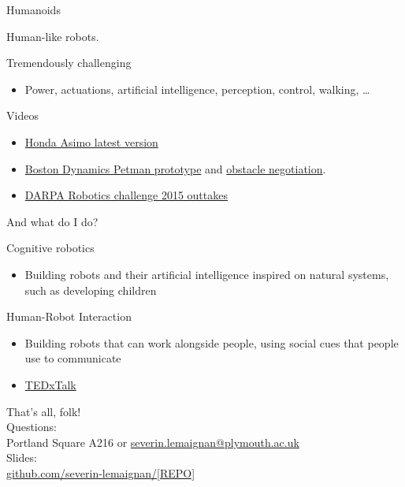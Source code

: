 \documentclass[compress]{beamer}
\begin{document}
\begin{frame}{Humanoids}

Human-like robots.

Tremendously challenging

\begin{itemize}
\item
  Power, actuations, artificial intelligence, perception, control,
  walking, \ldots{}
\end{itemize}

Videos

\begin{itemize}
\item
  \href{http://youtu.be/yND4k4NM0qU}{Honda Asimo latest version}
\item
  \href{http://youtu.be/aqCmX5dMYHg}{Boston Dynamics Petman prototype}
  and \href{http://youtu.be/FFGfq0pRczY}{obstacle negotiation}.
\item
  \href{https://www.youtube.com/watch?v=g0TaYhjpOfo}{DARPA Robotics
  challenge 2015 outtakes}
\end{itemize}

\end{frame}

\begin{frame}{And what do I do?}

Cognitive robotics

\begin{itemize}
\item
  Building robots and their artificial intelligence inspired on natural
  systems, such as developing children
\end{itemize}

Human-Robot Interaction

\begin{itemize}
\item
  Building robots that can work alongside people, using social cues that
  people use to communicate
\item
  \href{http://tedxtalks.ted.com/video/The-power-of-robots-with-a-face}{TEDxTalk}
\end{itemize}

\end{frame}


\begin{frame}{}
    \begin{center}
        \Large
        That's all, folk!\\[2em]
        \normalsize
        Questions:\\
        Portland Square A216 or \url{severin.lemaignan@plymouth.ac.uk} \\[1em]

        Slides:\\ \url{github.com/severin-lemaignan/[REPO]}

    \end{center}
\end{frame}
\end{document}
